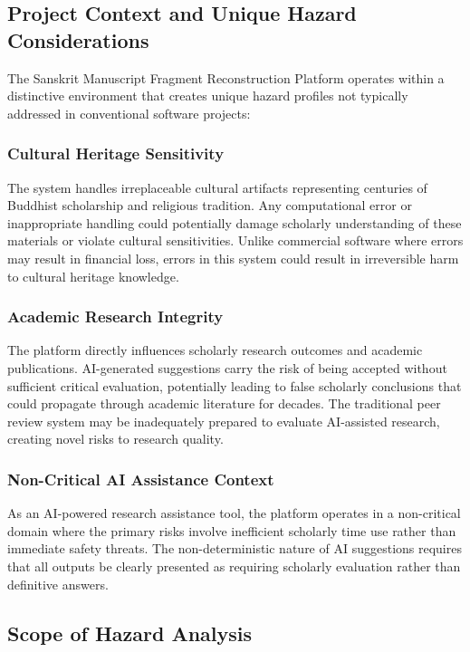 \documentclass{article}
\begin{document}
\subsection{Project Context and Unique Hazard Considerations}

The Sanskrit Manuscript Fragment Reconstruction Platform operates within a distinctive environment that creates unique hazard profiles not typically addressed in conventional software projects:

\subsubsection{Cultural Heritage Sensitivity}
The system handles irreplaceable cultural artifacts representing centuries of Buddhist scholarship and religious tradition. Any computational error or inappropriate handling could potentially damage scholarly understanding of these materials or violate cultural sensitivities. Unlike commercial software where errors may result in financial loss, errors in this system could result in irreversible harm to cultural heritage knowledge.

\subsubsection{Academic Research Integrity}
The platform directly influences scholarly research outcomes and academic publications. AI-generated suggestions carry the risk of being accepted without sufficient critical evaluation, potentially leading to false scholarly conclusions that could propagate through academic literature for decades. The traditional peer review system may be inadequately prepared to evaluate AI-assisted research, creating novel risks to research quality.

\subsubsection{Non-Critical AI Assistance Context}
As an AI-powered research assistance tool, the platform operates in a non-critical domain where the primary risks involve inefficient scholarly time use rather than immediate safety threats. The non-deterministic nature of AI suggestions requires that all outputs be clearly presented as requiring scholarly evaluation rather than definitive answers.

\subsection{Scope of Hazard Analysis}
\end{document}
